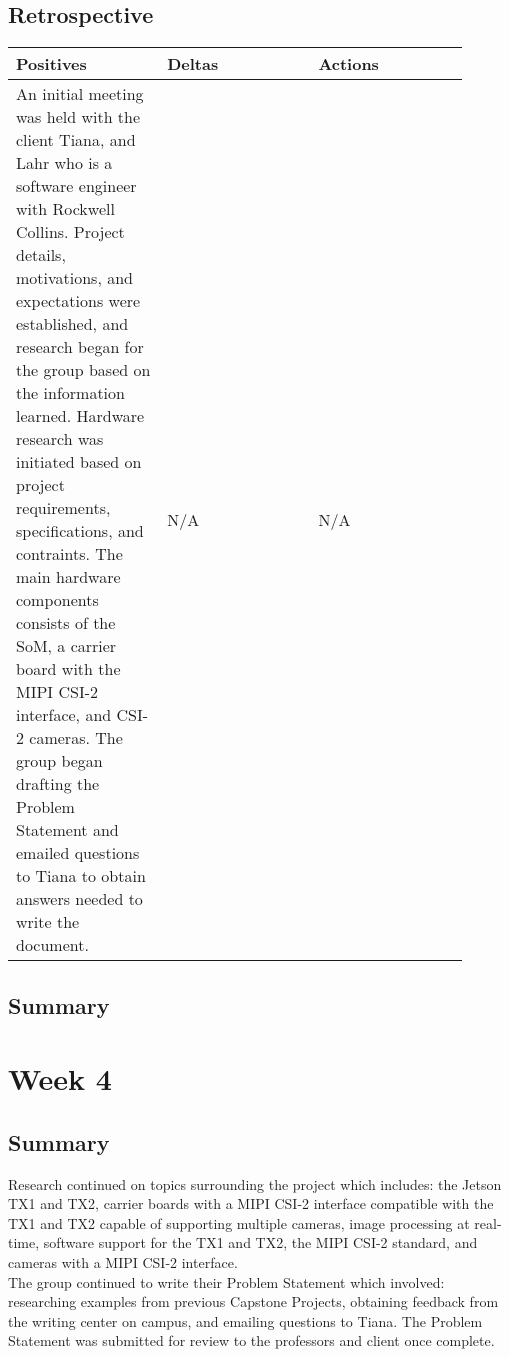 \documentclass[letterpaper,10pt,serif,draftclsnofoot,onecolumn,compsoc,titlepage]{IEEEtran}
\begin{document}
\subsection{Retrospective}

\begin{tabular}{|p{0.3\linewidth}|p{0.3\linewidth}|p{0.3\linewidth}|}
   \hline
   \textbf{Positives} & \textbf{Deltas} & \textbf{Actions}\\ 
   \hline
   An initial meeting was held with the client Tiana, and Lahr who is a software 
   engineer with Rockwell Collins. Project details, motivations, and expectations 
   were established, and research began for the group based on the information learned. 
   Hardware research was initiated based on project requirements, specifications, and 
   contraints. The main hardware components consists of the SoM, a carrier board with 
   the MIPI CSI-2 interface, and CSI-2 cameras. 
   The group began drafting the Problem Statement and emailed questions 
   to Tiana to obtain answers needed to write the document. 
   & 
   N/A
   & 
   N/A \\
   \hline
\end{tabular}

\subsection{Summary}

\section{Week 4}

\subsection{Summary}

Research continued on topics surrounding the project which includes: the Jetson TX1 and 
TX2, carrier boards with a MIPI CSI-2 interface compatible with the TX1 and TX2 
capable of supporting multiple cameras, image processing at real-time, software support 
for the TX1 and TX2, the MIPI CSI-2 standard, and cameras with a MIPI CSI-2 interface. \\

The group continued to write their Problem Statement which involved: researching 
examples from previous Capstone Projects, obtaining feedback from the writing center 
on campus, and emailing questions to Tiana. 
The Problem Statement was submitted for review to the professors and client once 
complete. \\
\end{document}
